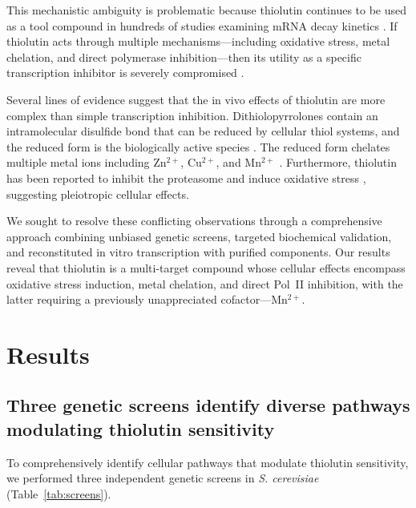 \documentclass[11pt,a4paper]{article}
\begin{document}
This mechanistic ambiguity is problematic because thiolutin continues to be used as a tool compound in hundreds of studies examining mRNA decay kinetics \citep{Grigull2004, Miller2011}. If thiolutin acts through multiple mechanisms---including oxidative stress, metal chelation, and direct polymerase inhibition---then its utility as a specific transcription inhibitor is severely compromised \citep{Pelechano2010}.

Several lines of evidence suggest that the in vivo effects of thiolutin are more complex than simple transcription inhibition. Dithiolopyrrolones contain an intramolecular disulfide bond that can be reduced by cellular thiol systems, and the reduced form is the biologically active species \citep{Li2014, Waring2014}. The reduced form chelates multiple metal ions including Zn$^{2+}$, Cu$^{2+}$, and Mn$^{2+}$ \citep{Chan2017}. Furthermore, thiolutin has been reported to inhibit the proteasome and induce oxidative stress \citep{Lauber2016}, suggesting pleiotropic cellular effects.

We sought to resolve these conflicting observations through a comprehensive approach combining unbiased genetic screens, targeted biochemical validation, and reconstituted in vitro transcription with purified components. Our results reveal that thiolutin is a multi-target compound whose cellular effects encompass oxidative stress induction, metal chelation, and direct Pol~II inhibition, with the latter requiring a previously unappreciated cofactor---Mn$^{2+}$.

\section{Results}

\subsection{Three genetic screens identify diverse pathways modulating thiolutin sensitivity}

To comprehensively identify cellular pathways that modulate thiolutin sensitivity, we performed three independent genetic screens in \textit{S. cerevisiae} (Table~\ref{tab:screens}).
\end{document}
